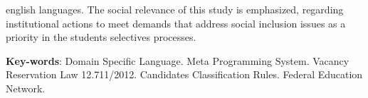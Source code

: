 \begin{resumo}[Abstract]
\begin{otherlanguage*}{english}
languages. The social relevance of this study is emphasized, regarding institutional actions to meet demands that address social inclusion issues as a priority in the students selectives processes.



   \vspace{\onelineskip} 
 
   \noindent 
   \textbf{Key-words}: Domain Specific Language. Meta Programming System. Vacancy Reservation Law 12.711/2012. Candidates Classification Rules. Federal Education Network.
 \end{otherlanguage*}
 \end{resumo}
